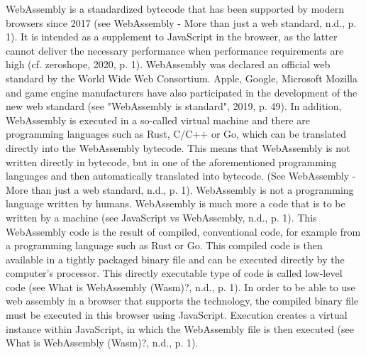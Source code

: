 WebAssembly is a standardized bytecode that has been supported by modern browsers since 2017 (see WebAssembly - More than just a web standard, n.d., p. 1). It is intended as a supplement to JavaScript in the browser, as the latter cannot deliver the necessary performance when performance requirements are high (cf. zeroshope, 2020, p. 1).
WebAssembly was declared an official web standard by the World Wide Web Consortium. Apple, Google, Microsoft Mozilla and game engine manufacturers have also participated in the development of the new web standard (see "WebAssembly is standard", 2019, p. 49).
In addition, WebAssembly is executed in a so-called virtual machine and there are programming languages such as Rust, C/C++ or Go, which can be translated directly into the WebAssembly bytecode. This means that WebAssembly is not written directly in bytecode, but in one of the aforementioned programming languages and then automatically translated into bytecode. (See WebAssembly - More than just a web standard, n.d., p. 1).
WebAssembly is not a programming language written by humans. WebAssembly is much more a code that is to be written by a machine (see JavaScript vs WebAssembly, n.d., p. 1). This WebAssembly code is the result of compiled, conventional code, for example from a programming language such as Rust or Go. This compiled code is then available in a tightly packaged binary file and can be executed directly by the computer's processor. This directly executable type of code is called low-level code (see What is WebAssembly (Wasm)?, n.d., p. 1).
In order to be able to use web assembly in a browser that supports the technology, the compiled binary file must be executed in this browser using JavaScript. Execution creates a virtual instance within JavaScript, in which the WebAssembly file is then executed (see What is WebAssembly (Wasm)?, n.d., p. 1).
